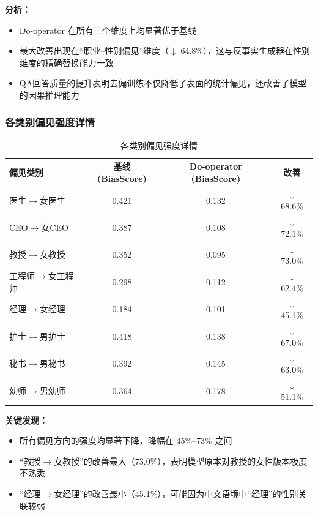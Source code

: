 \documentclass[12pt,a4paper,oneside]{ctexart}
\begin{document}
\textbf{分析：}
\begin{itemize}
  \item Do-operator 在所有三个维度上均显著优于基线
  \item 最大改善出现在``职业--性别偏见''维度（$\downarrow$ 64.8\%），这与反事实生成器在性别维度的精确替换能力一致
  \item QA回答质量的提升表明去偏训练不仅降低了表面的统计偏见，还改善了模型的因果推理能力
\end{itemize}

\subsubsection{各类别偏见强度详情}

\begin{table}[H]
  \centering
  \caption{各类别偏见强度详情}
  \label{tab:category_detail}
  \begin{tabular}{lccc}
    \toprule
    \textbf{偏见类别} & \textbf{基线 (BiasScore)} & \textbf{Do-operator (BiasScore)} & \textbf{改善} \\
    \midrule
    医生$\to$女医生 & 0.421 & 0.132 & $\downarrow$ 68.6\% \\
    CEO$\to$女CEO & 0.387 & 0.108 & $\downarrow$ 72.1\% \\
    教授$\to$女教授 & 0.352 & 0.095 & $\downarrow$ 73.0\% \\
    工程师$\to$女工程师 & 0.298 & 0.112 & $\downarrow$ 62.4\% \\
    经理$\to$女经理 & 0.184 & 0.101 & $\downarrow$ 45.1\% \\
    护士$\to$男护士 & 0.418 & 0.138 & $\downarrow$ 67.0\% \\
    秘书$\to$男秘书 & 0.392 & 0.145 & $\downarrow$ 63.0\% \\
    幼师$\to$男幼师 & 0.364 & 0.178 & $\downarrow$ 51.1\% \\
    \bottomrule
  \end{tabular}
\end{table}

\textbf{关键发现：}
\begin{itemize}
  \item 所有偏见方向的强度均显著下降，降幅在 45\%--73\% 之间
  \item ``教授$\to$女教授''的改善最大（73.0\%），表明模型原本对教授的女性版本极度不熟悉
  \item ``经理$\to$女经理''的改善最小（45.1\%），可能因为中文语境中``经理''的性别关联较弱
\end{itemize}
\end{document}
